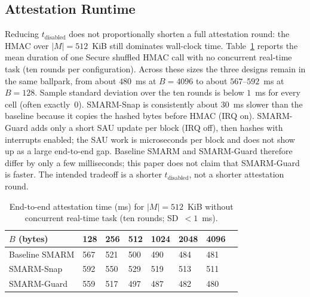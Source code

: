 \documentclass[conference]{IEEEtran}
\newcommand{\tdis}{$t_{\mathrm{disabled}}$\xspace}
\newcommand{\smarmcopy}{SMARM-Snap\xspace}
\newcommand{\smarmlock}{SMARM-Guard\xspace}
\begin{document}
\subsection{Attestation Runtime}
Reducing \tdis{} does not proportionally shorten a full attestation round:
the HMAC over $|M|{=}512$~KiB still dominates wall-clock time.
Table~\ref{tab:attest_runtime} reports the mean duration of one Secure shuffled HMAC call with no concurrent real-time task (ten rounds per configuration).
Across these sizes the three designs remain in the same ballpark, from about $480$~ms at $B{=}4096$ to about $567$--$592$~ms at $B{=}128$.
Sample standard deviation over the ten rounds is below $1$~ms for every cell (often exactly~$0$).
\smarmcopy{} is consistently about $30$~ms slower than the baseline because it copies the hashed bytes before HMAC (IRQ on).
\smarmlock{} adds only a short SAU update per block (IRQ off), then hashes with interrupts enabled; the SAU work is microseconds per block and does not show up as a large end-to-end gap.
Baseline SMARM and \smarmlock{} therefore differ by only a few milliseconds; this paper does not claim that \smarmlock{} is faster.
The intended tradeoff is a shorter \tdis{}, not a shorter attestation round.


\begin{table}[!t]
  \centering
  \caption{End-to-end attestation time (ms) for $|M|=512$~KiB without concurrent real-time task (ten rounds; SD~$<1$~ms).}
  \label{tab:attest_runtime}
  \footnotesize
  \setlength{\tabcolsep}{3.5pt}
  \begin{tabularx}{\columnwidth}{@{}lXXXXXXX@{}}
    \toprule
    \textbf{$B$ (bytes)} & 128 & 256 & 512 & 1024 & 2048 & 4096 \\
    \midrule
    Baseline SMARM & 567 & 521 & 500 & 490 & 484 & 481 \\
    \smarmcopy & 592 & 550 & 529 & 519 & 513 & 511 \\
    \smarmlock & 559 & 517 & 497 & 487 & 482 & 480 \\
    \bottomrule
  \end{tabularx}
\end{table}

\end{document}
